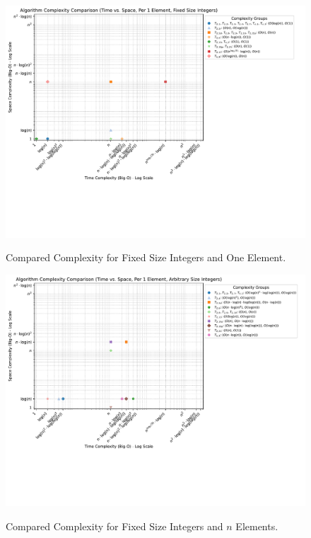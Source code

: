 \documentclass[conference]{IEEEtran}
\begin{document}
\begin{figure}[H]
    \centering
    \vspace{-20pt}
    \caption{Compared Complexity for Fixed Size Integers and One Element.}
    \includegraphics[width=\linewidth, trim=0 0 0 0, clip]{figures/complexity/complexity_comparison_0_0.pdf}
    \label{fig:complexity_0_0}
    \vspace{-25pt}
\end{figure}

\begin{figure}[H]
    \centering
    \vspace{-20pt}
    \caption{Compared Complexity for Fixed Size Integers and $n$ Elements.}
    \includegraphics[width=\linewidth, trim=0 0 0 0, clip]{figures/complexity/complexity_comparison_0_1.pdf}
    \label{fig:complexity_0_1}
    \vspace{-25pt}
\end{figure}
\end{document}

